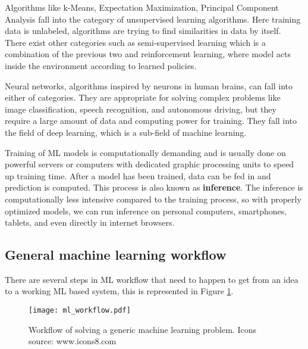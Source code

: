 Algorithms like k-Means, Expectation Maximization, Principal Component Analysis fall into the category of unsupervised learning algorithms.
Here training data is unlabeled, algorithms are trying to find similarities in data by itself\cite{geron}.
There exist other categories such as semi-supervised learning which is a combination of the previous two and reinforcement learning, where model acts inside the environment according to learned policies\cite{geron}.

Neural networks, algorithms inspired by neurons in human brains\cite{geron}\cite{cs231n}, can fall into either of categories. 
They are appropriate for solving complex problems like image classification, speech recognition, and autonomous driving, but they require a large amount of data and computing power for training.
They fall into the field of deep learning, which is a sub-field of machine learning.

Training of ML models is computationally demanding and is usually done on powerful servers or computers with dedicated graphic processing units to speed up training time.
After a model has been trained, data can be fed in and prediction is computed. 
This process is also known as \textbf{inference}.
The inference is computationally less intensive compared to the training process, so with properly optimized models, we can run inference on personal computers, smartphones, tablets, and even directly in internet browsers.


\subsection{ General machine learning workflow}

There are several steps in ML workflow that need to happen to get from an idea to a working ML based system, this is represented in Figure \ref{ml_workflow}.

\begin{figure}[ht]
        \centering
        \texttt{[image: ml\_workflow.pdf]} 
        \caption{ Workflow of solving a generic machine learning problem. Icons source: www.icons8.com}
        \label{ml_workflow}
\end{figure}

